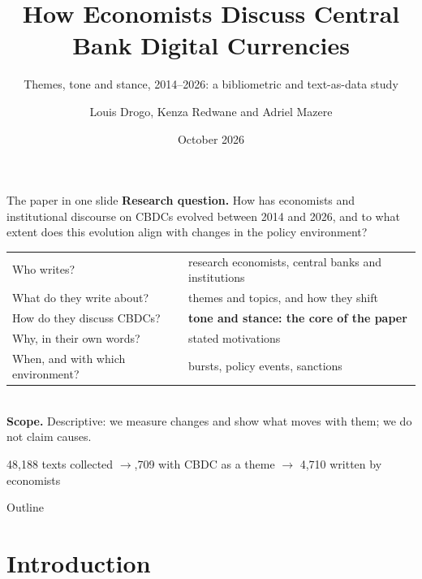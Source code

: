 \documentclass[aspectratio=169,10pt]{beamer}
\title{How Economists Discuss Central Bank Digital Currencies}
\subtitle{Themes, tone and stance, 2014--2026: a bibliometric and text-as-data study}
\author{Louis Drogo, Kenza Redwane and Adriel Mazere}
\institute{M2 -- Private crypto}
\date{October 2026}
\begin{document}
\begin{frame}
\titlepage
{}
\end{frame}

\begin{frame}{The paper in one slide}
\textbf{Research question.} How has economists and institutional discourse on CBDCs evolved between 2014 and 2026, and to what extent does this evolution align with changes in the policy environment?\\[5pt]
\small
\begin{tabular}{@{}ll@{}}
\alert{Who} writes? & research economists, central banks and institutions\\
\alert{What} do they write about? & themes and topics, and how they shift\\
\alert{How} do they discuss CBDCs? & \textbf{tone and stance: the core of the paper}\\
\alert{Why}, in their own words? & stated motivations\\
\alert{When}, and with which environment? & bursts, policy events, sanctions\\
\end{tabular}\\[5pt]
\textbf{Scope.} Descriptive: we measure changes and show what moves with them; we do not claim causes.
\vfill
\begin{center}48,188 texts collected \;$\to$,709 with CBDC as a theme \;$\to$\; \alert{4,710 written by economists}\end{center}
\end{frame}

\begin{frame}{Outline}
\tableofcontents
{}
\end{frame}

\section{Introduction}
\end{document}
